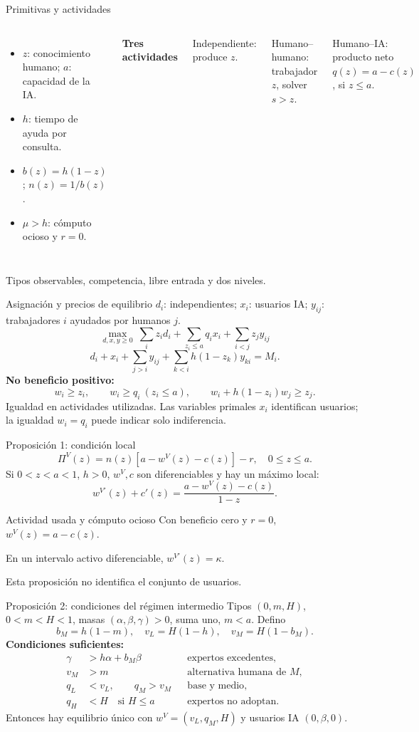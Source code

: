 \documentclass[aspectratio=169,11pt]{beamer}
\begin{document}
\begin{frame}{Primitivas y actividades}
\begin{columns}[T]
\begin{itemize}
\item $z$: conocimiento humano; $a$: capacidad de la IA.
\item $h$: tiempo de ayuda por consulta.
\item $b(z)=h(1-z)$; $n(z)=1/b(z)$.
\item $\mu>h$: cómputo ocioso y $r=0$.
\end{itemize}
\textbf{Tres actividades}\par\medskip
Independiente: produce $z$.\par\medskip
Humano--humano: trabajador $z$, solver $s>z$.\par\medskip
Humano--IA: producto neto $q(z)=a-c(z)$, si $z\leq a$.
\end{columns}
\medskip
Tipos observables, competencia, libre entrada y dos niveles.
\end{frame}
\begin{frame}{Asignación y precios de equilibrio}
\small
$d_i$: independientes; $x_i$: usuarios IA; $y_{ij}$: trabajadores $i$ ayudados por humanos $j$.
\[
\max_{d,x,y\geq0}\ \sum_i z_id_i+\sum_{z_i\leq a}q_ix_i+\sum_{i<j}z_jy_{ij}
\]
\[
d_i+x_i+\sum_{j>i}y_{ij}+\sum_{k<i}h(1-z_k)y_{ki}=M_i.
\]
\textbf{No beneficio positivo:}
\[
w_i\geq z_i,\qquad w_i\geq q_i\ (z_i\leq a),\qquad
w_i+h(1-z_i)w_j\geq z_j.
\]
Igualdad en actividades utilizadas. Las variables primales $x_i$ identifican usuarios; la igualdad $w_i=q_i$ puede indicar solo indiferencia.
\end{frame}
\begin{frame}{Proposición 1: condición local}
\[
\Pi^V(z)=n(z)[a-w^V(z)-c(z)]-r,\quad 0\leq z\leq a.
\]
Si $0<z<a<1$, $h>0$, $w^V,c$ son diferenciables y hay un máximo local:
\[
w^{V\prime}(z)+c'(z)=\frac{a-w^V(z)-c(z)}{1-z}.
\]
\begin{block}{Actividad usada y cómputo ocioso}
Con beneficio cero y $r=0$, $w^V(z)=a-c(z)$.\par
En un intervalo activo diferenciable, $w^{V\prime}(z)=\kappa$.
\end{block}
\alert{Esta proposición no identifica el conjunto de usuarios.}
\end{frame}
\begin{frame}{Proposición 2: condiciones del régimen intermedio}
\small
Tipos $(0,m,H)$, $0<m<H<1$, masas $(\alpha,\beta,\gamma)>0$, suma uno, $m<a$. Defino
\[
 b_M=h(1-m),\quad v_L=H(1-h),\quad v_M=H(1-b_M).
\]
\textbf{Condiciones suficientes:}
\begin{align*}
\gamma&>h\alpha+b_M\beta &&\text{expertos excedentes},\\
v_M&>m &&\text{alternativa humana de }M,\\
q_L&<v_L,\qquad q_M>v_M &&\text{base y medio},\\
q_H&<H\quad\text{si }H\leq a &&\text{expertos no adoptan}.
\end{align*}
Entonces hay equilibrio único con $w^V=(v_L,q_M,H)$ y usuarios IA $(0,\beta,0)$.
\end{frame}
\end{document}

